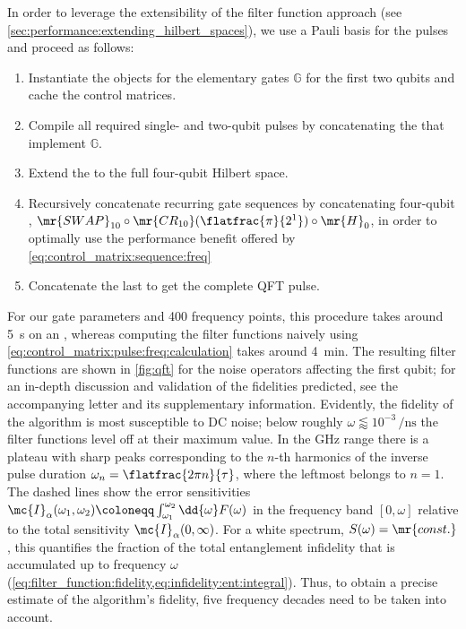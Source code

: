 In order to leverage the extensibility of the filter function approach (see \cref{sec:performance:extending_hilbert_spaces}), we use a Pauli basis for the pulses and proceed as follows:
\begin{enumerate}
    \item Instantiate the \pulsesequence objects for the elementary gates $\mathbb{G}$ for the first two qubits and cache the control matrices.
    \item Compile all required single- and two-qubit pulses by concatenating the \pulsesequences that implement $\mathbb{G}$.
    \item Extend the \pulsesequences to the full four-qubit Hilbert space.
    \item Recursively concatenate recurring gate sequences by concatenating four-qubit \pulsesequences, \eg $\mr{SWAP}_{10}\circ\mr{CR_{10}}(\flatfrac{\pi}{2^1})\circ\mr{H}_0$, in order to optimally use the performance benefit offered by \cref{eq:control_matrix:sequence:freq}
    \item Concatenate the last \pulsesequences to get the complete QFT pulse.
\end{enumerate}
For our gate parameters and \num{400} frequency points, this procedure takes around \SI{5}{\second} on an \fastprocessor, whereas computing the filter functions naively using \cref{eq:control_matrix:pulse:freq:calculation} takes around \SI{4}{\minute}. The resulting filter functions are shown in \cref{fig:qft} for the noise operators affecting the first qubit; for an in-depth discussion and validation of the fidelities predicted, see the accompanying letter  and its supplementary information. Evidently, the fidelity of the algorithm is most susceptible to DC noise; below roughly $\omega\lessapprox 10^{-3}\,\si{\per\nano\second}$ the filter functions level off at their maximum value. In the \si{\giga\hertz} range there is a plateau with sharp peaks corresponding to the $n$-th harmonics of the inverse pulse duration $\omega_n = \flatfrac{2\pi n}{\tau}$, where the leftmost belongs to $n=1$. The dashed lines show the error sensitivities $\mc{I}_\alpha(\omega_1, \omega_2)\coloneqq\int_{\omega_1}^{\omega_2}\dd{\omega}F(\omega)$ in the frequency band $[0, \omega]$ relative to the total sensitivity $\mc{I}_\alpha(0,\infty)$. For a white spectrum, \ie $S(\omega)=\mr{const.}$, this quantifies the fraction of the total entanglement infidelity that is accumulated up to frequency $\omega$ (\cf \cref{eq:filter_function:fidelity,eq:infidelity:ent:integral}). Thus, to obtain a precise estimate of the algorithm's fidelity, five frequency decades need to be taken into account.

